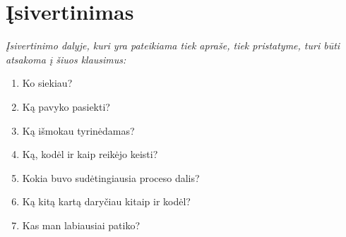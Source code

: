 \newpage
\section{Įsivertinimas}
\textit{Įsivertinimo dalyje, kuri yra pateikiama tiek apraše, tiek pristatyme, turi būti atsakoma į šiuos klausimus:}
\begin{enumerate}
    \item Ko siekiau?
    \item Ką pavyko pasiekti?
    \item Ką išmokau tyrinėdamas?
    \item Ką, kodėl ir kaip reikėjo keisti?
    \item Kokia buvo sudėtingiausia proceso dalis?
    \item Ką kitą kartą daryčiau kitaip ir kodėl?
    \item Kas man labiausiai patiko?
\end{enumerate}
